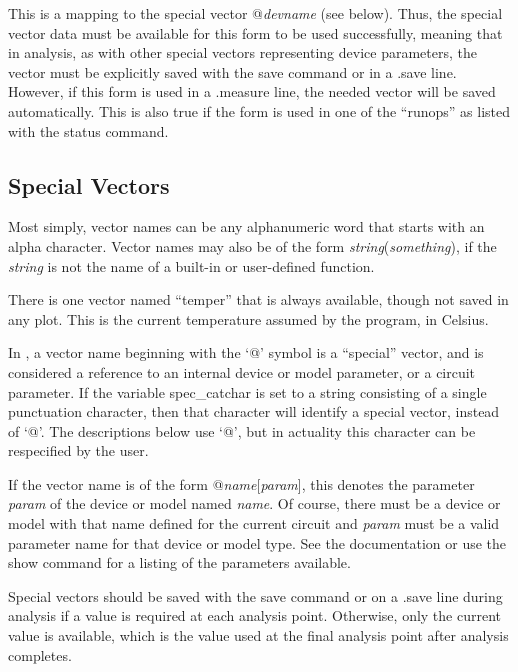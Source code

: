 This is a mapping to the special vector {\vt @}{\it devname\/}{\vt
[p]} (see below).  Thus, the special vector data must be available for
this form to be used successfully, meaning that in analysis, as with
other special vectors representing device parameters, the vector must
be explicitly saved with the {\cb save} command or in a {\vt .save}
line.  However, if this form is used in a {\vt .measure} line, the
needed vector will be saved automatically.  This is also true if the
form is used in one of the ``runops'' as listed with the {\cb status}
command.

\subsection{Special Vectors}
\label{specialvec}

Most simply, vector names can be any alphanumeric word that starts
with an alpha character.  Vector names may also be of the form {\it
string\/}({\it something\/}), if the {\it string} is not the name of a
built-in or user-defined function.

There is one vector named ``{\vt temper}'' that is always available,
though not saved in any plot.  This is the current temperature assumed
by the program, in Celsius.

In {\WRspice}, a vector name beginning with the `{\vt @}' symbol is a
``special'' vector, and is considered a reference to an internal
device or model parameter, or a circuit parameter.  If the variable
{\et spec\_catchar} is set to a string consisting of a single
punctuation character, then that character will identify a special
vector, instead of `{\vt @}'.  The descriptions below use `{\vt @}',
but in actuality this character can be respecified by the user.

If the vector name is of the form {\vt @{\it name}[{\it param}]}, this
denotes the parameter {\it param} of the device or model named {\it
name}.  Of course, there must be a device or model with that name
defined for the current circuit and {\it param} must be a valid
parameter name for that device or model type.  See the documentation
or use the {\cb show} command for a listing of the parameters
available.

Special vectors should be saved with the {\cb save} command or on a
{\vt .save} line during analysis if a value is required at each
analysis point.  Otherwise, only the current value is available, which
is the value used at the final analysis point after analysis
completes.

